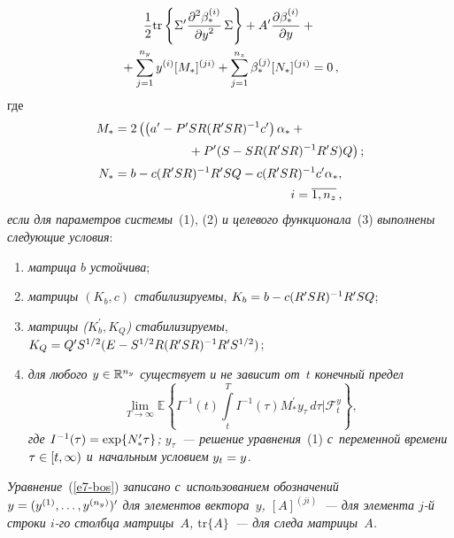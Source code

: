 \begin{multicols}{2}
\noindent
\begin{multline}
\displaystyle\frac{\displaystyle 1\mathstrut}{\displaystyle 2\mathstrut}\mathrm{tr}\left\{ \Sigma^{\prime} \displaystyle\frac{\displaystyle \partial^2\beta_*^{(i)}\mathstrut}{\displaystyle \partial y^2\mathstrut}\,\Sigma\right\} +A^\prime \displaystyle\frac{\displaystyle \partial\beta_*^{(i)}\mathstrut}{\displaystyle \partial y\mathstrut} +{}\\
{}+\displaystyle\sum\limits_{j=1}^{n_y} y^{(i)} [M_*]^{(ji)} +\sum\limits_{j=1}^{n_z} 
\beta_*^{(j)} [N_*]^{(ji)} =0\,,
\label{e7-bos}
\end{multline}
где
\begin{align*}
M_*&=2\left( \left( a^\prime -P^\prime SR(R^\prime SR)^{-1} c^\prime 
\right)\alpha_*+{}\right.\\[2pt]
&\hspace*{20mm}\left.{}+ P^\prime (S-SR(R^\prime SR)^{-1} R^\prime S)Q\right);\\[2pt]
N_*&= b-c(R^\prime SR)^{-1}R^\prime SQ -c(R^\prime SR)^{-1} c^\prime \alpha_*,\\[2pt]
&\hspace*{50mm}i=\overline{1, n_z}\,,
\end{align*}
\textit{если для параметров системы}~(1), (2) \textit{и целевого 
функционала}~(3) \textit{выполнены сле\-ду\-ющие условия}:
\begin{enumerate}[(1)]
\item \textit{матрица $b$ устойчива};
\item \textit{матрицы $(K_b, c)$ стабилизируемы}, $K_b\hm= b\hm- 
c(R^\prime SR)^{-1} R^\prime SQ$;
\item \textit{матрицы ($K_b^\prime, K_Q$) стабилизируемы}, $K_Q\hm= Q^\prime S^{1/2}(E\hm- S^{1/2}R(R^\prime SR)^{-1} R^\prime S^{1/2})$;
\item \textit{для любого $y\hm\in \mathbb{R}^{n_y}$ существует и не 
зависит от~$t$ конечный предел}
\begin{equation}
\lim\limits_{T\to\infty} \mathbb{E}\left\{ I^{-1}(t)\int\limits_t^{{T}} I^{-1}(\tau)M^\prime_* y_\tau\,d\tau \vert \mathcal{F}_t^y \right\},
\label{e8-bos}
\end{equation}
\textit{где $I^{-1}(\tau)\hm=\exp \{ N_*^\prime \tau\}$; $y_\tau$~--- 
решение уравнения}~(1) \textit{с~переменной времени $\tau\hm\in 
[t,\infty)$ и~начальным условием} $y_t\hm= y$.
\end{enumerate}

     \textit{Уравнение}~(\ref{e7-bos}) \textit{записано с~использованием 
обозначений $y\hm= (y^{(1)}, \ldots , y^{(n_y)})^\prime$ для элементов 
вектора~$y$, $[A]^{(ji)}$~--- для элемента $j$-й строки $i$-го столб\-ца 
мат\-ри\-цы~$A$, $\mathrm{tr}\{A\}$~--- для следа мат\-ри\-цы~$A$.}
     

\end{multicols}
